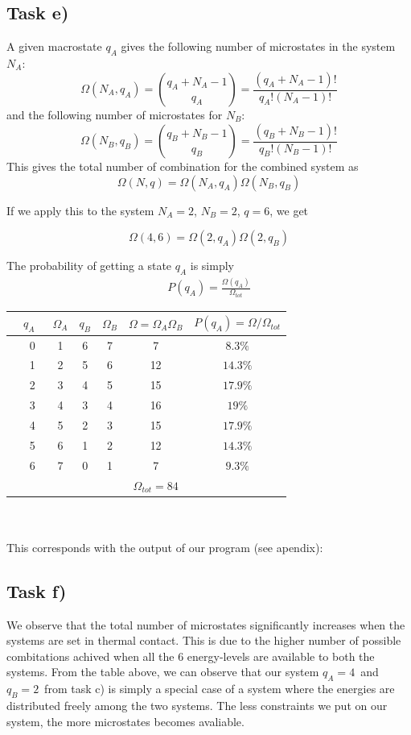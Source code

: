 \documentclass[12p,a4paper]{article}
\begin{document}
\subsection*{Task e)}
A given macrostate $q_A$ gives the following number of microstates in the system $N_A$:
\[
	\Omega(N_A,q_A) = \binom{q_A+N_A-1}{q_A} = \frac{(q_A+N_A-1)!}{q_A!(N_A-1)!}
\]
and the following number of microstates for $N_B$:
\[
	\Omega(N_B,q_B) = \binom{q_B+N_B-1}{q_B} = \frac{(q_B+N_B-1)!}{q_B!(N_B-1)!}
\]
This gives the total number of combination for the combined system as
\[
	\Omega(N, q) = \Omega(N_A,q_A)\Omega(N_B,q_B)
\]

If we apply this to the system $N_A=2$, $N_B=2$, $q=6$, we get

\[
	\Omega(4, 6) = \Omega(2,q_A)\Omega(2,q_B)
\]

The probability of getting a state $q_A$ is simply
\begin{align*}
    P(q_A) = \frac{\Omega(q_A)}{\Omega_{tot}}
\end{align*}


\begin{tabular}{c c c c c | c | c}
				& $q_A$ & $\Omega_A$ & $q_B$ & $\Omega_B$ & $\Omega=\Omega_A\Omega_B$ & $P(q_A) = \Omega/\Omega_{tot}$ \\
\hline
				& 0 & 1 & 6 & 7 & 7  & $8.3\%$\\
 				& 1 & 2 & 5 & 6 & 12 & $14.3\%$\\
 				& 2 & 3 & 4 & 5 & 15 & $17.9\%$\\
 				& 3 & 4 & 3 & 4 & 16 & $19\%$\\
 				& 4 & 5 & 2 & 3 & 15 & $17.9\%$\\
 				& 5 & 6 & 1 & 2 & 12 & $14.3\%$\\
 				& 6 & 7 & 0 & 1 & 7  & $9.3\%$\\
\hline
				&   &   &   &   & $\Omega_{tot}=84$ &
\end{tabular}
\\
\\

This corresponds with the output of our program (see apendix):\\




\subsection*{Task f)}
We observe that the total number of microstates significantly increases when the systems are set in thermal contact. This is due to the higher number of possible combitations achived when all the 6 energy-levels are available to both the systems. From the table above, we can observe that our system $q_A = 4$ and $q_B = 2$ from task c) is simply a special case of a system where the energies are distributed freely among the two systems. The less constraints we put on our system, the more microstates becomes avaliable.
\end{document}
